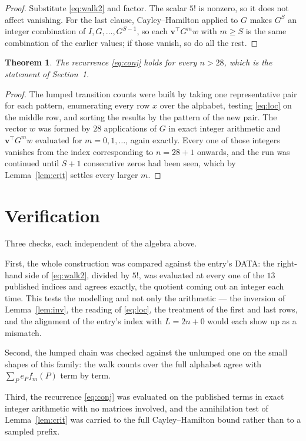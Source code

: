 \documentclass[11pt,a4paper]{article}
\theoremstyle{plain}
\newtheorem{theorem}{Theorem}
\theoremstyle{definition}
\begin{document}
\begin{proof}
Substitute \eqref{eq:walk2} and factor. The scalar $5!$ is nonzero, so it does not
affect vanishing. For the last clause, Cayley--Hamilton applied to $G$ makes $G^{S}$ an
integer combination of $I,G,\dots,G^{S-1}$, so each $\mathbf{v}^{\!\top}G^{m}w$ with
$m\ge S$ is the same combination of the earlier values; if those vanish, so do all the rest.
\end{proof}

\begin{theorem}
The recurrence \eqref{eq:conj} holds for every $n>28$, which is the statement of
Section~1.
\end{theorem}

\begin{proof}
The lumped transition counts were built by taking one representative pair for each pattern,
enumerating every row $x$ over the alphabet, testing \eqref{eq:loc} on the middle
row, and sorting the results by the pattern of the new pair. The vector $w$ was formed by
$28$ applications of $G$ in exact integer arithmetic and $\mathbf{v}^{\!\top}G^{m}w$
evaluated for $m=0,1,\dots$, again exactly. Every one of those integers vanishes from the
index corresponding to $n=28+1$ onwards, and the run was continued until $S+1$
consecutive zeros had been seen, which by Lemma~\ref{lem:crit} settles every larger $m$.
\end{proof}

\section{Verification}

Three checks, each independent of the algebra above.

First, the whole construction was compared against the entry's DATA: the right-hand side of
\eqref{eq:walk2}, divided by $5!$, was evaluated at every one of the $13$
published indices and agrees exactly, the quotient coming out an integer each time. This
tests the modelling and not only the arithmetic --- the inversion of Lemma~\ref{lem:inv},
the reading of \eqref{eq:loc}, the treatment of the first and last rows, and the
alignment of the entry's index with $L=2n+0$ would each show up as a mismatch.

Second, the lumped chain was checked against the unlumped one on the small shapes of this
family: the walk counts over the full alphabet agree with $\sum_P e_Pf_m(P)$ term by term.

Third, the recurrence \eqref{eq:conj} was evaluated on the published terms in exact integer
arithmetic with no matrices involved, and the annihilation test of Lemma~\ref{lem:crit} was
carried to the full Cayley--Hamilton bound rather than to a sampled prefix.
\end{document}
